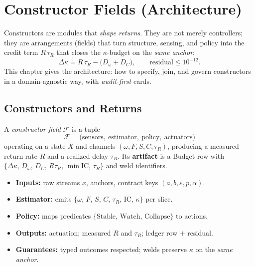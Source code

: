 \chapter{Constructor Fields (Architecture)}
\label{ch:constructors}

Constructors are modules that \emph{shape returns}. They are not merely controllers; they are arrangements (fields) that turn structure, sensing, and policy into the credit term \(R\,\tau_{R}\) that closes the \(\kappa\)-budget on the \emph{same anchor}:
\[
\Delta\kappa \stackrel{!}{=} R\,\tau_{R} - \bigl(D_{\omega}+D_{C}\bigr),
\qquad \text{residual}\le 10^{-12}.
\]
This chapter gives the architecture: how to specify, join, and govern constructors in a domain-agnostic way, with \emph{audit-first} cards.

\section{Constructors and Returns}
\label{sec:constructors-and-returns}

\begin{definition}
A \emph{constructor field} \(\mathcal{F}\) is a tuple
\[
\mathcal{F} = \bigl(\text{sensors},\ \text{estimator},\ \text{policy},\ \text{actuators}\bigr)
\]
operating on a state \(X\) and channels \((\omega,F,S,C,\tau_{R})\), producing a measured return rate \(R\) and a realized delay \(\tau_{R}\).
Its \textbf{artifact} is a Budget row with \(\{\Delta\kappa,\,D_{\omega},\,D_{C},\,R\tau_{R},\,\min\mathrm{IC},\,\tau_{R}\}\) and weld identifiers.
\end{definition}

\begin{eqbox}
\begin{itemize}[leftmargin=1.25em]
  \item \textbf{Inputs:} raw streams \(x\), anchors, contract keys \((a,b,\varepsilon,p,\alpha)\).
  \item \textbf{Estimator:} emits \(\{\omega,\,F,\,S,\,C,\,\tau_{R},\,\mathrm{IC},\,\kappa\}\) per slice.
  \item \textbf{Policy:} maps predicates \(\{\text{Stable, Watch, Collapse}\}\) to actions.
  \item \textbf{Outputs:} actuation; measured \(R\) and \(\tau_{R}\); ledger row \(+\) residual.
  \item \textbf{Guarantees:} typed outcomes respected; welds preserve \(\kappa\) on the \emph{same anchor}.
\end{itemize}
\end{eqbox}


